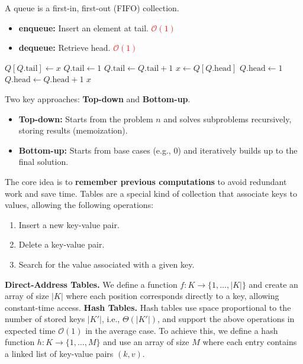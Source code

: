 \documentclass[a4paper,landscape]{article}
\newcommand{\timecomplexity}[1]{\textcolor{red}{#1}}
\newcommand{\bigo}{\mathcal{O}}
\begin{document}
\begin{multicols}{7}
\endtcolorbox
\tcolorbox[mybox={Queue}]
A queue is a first-in, first-out (FIFO) collection.
\begin{itemize}[noitemsep,itemsep=0pt]
    \item \textbf{enqueue:} Insert an element at tail. \timecomplexity{\(\bigo(1)\)}
    \item \textbf{dequeue:} Retrieve head. \timecomplexity{\(\bigo(1)\)}
\end{itemize}
\begin{algorithmic}[1]
        \State $Q[Q.\text{tail}] \gets x$
            \State $Q.\text{tail} \gets 1$
        \Else
            \State $Q.\text{tail} \gets Q.\text{tail} + 1$
        \EndIf
    \EndProcedure
    \State
        \State $x \gets Q[Q.\text{head}]$
            \State $Q.\text{head} \gets 1$
        \Else
            \State $Q.\text{head} \gets Q.\text{head} + 1$
        \EndIf
        \State \Return $x$
    \EndProcedure
\end{algorithmic}
\endtcolorbox
\tcolorbox[mybox={Dynamic Programming}]
Two key approaches: \textbf{Top-down} and \textbf{Bottom-up}.
\begin{itemize}[noitemsep, itemsep=0pt]
    \item \textbf{Top-down:} Starts from the problem $n$ and solves subproblems recursively, storing results (memoization).
    \item \textbf{Bottom-up:} Starts from base cases (e.g., 0) and iteratively builds up to the final solution.
\end{itemize}
The core idea is to \textbf{remember previous computations} to avoid redundant work and save time.
\endtcolorbox
\tcolorbox[mybox={Hash Functions and Tables}]
Tables are a special kind of collection that associate keys to values, allowing the following operations:
\begin{enumerate}[noitemsep, topsep=0pt]
    \item Insert a new key-value pair.
    \item Delete a key-value pair.
    \item Search for the value associated with a given key.
\end{enumerate}
\noindent\textbf{Direct-Address Tables.}  
We define a function $f : K \rightarrow \{1, \dots, |K|\}$ and create an array of size $|K|$ where each position corresponds directly to a key, allowing constant-time access.
\noindent\textbf{Hash Tables.}  
Hash tables use space proportional to the number of stored keys $|K'|$, i.e., $\Theta(|K'|)$, and support the above operations in expected time $\bigo(1)$ in the average case.  
To achieve this, we define a hash function $h : K \rightarrow \{1, \dots, M\}$ and use an array of size $M$ where each entry contains a linked list of key-value pairs $(k, v)$.
\endtcolorbox


\end{multicols}
\end{document}
